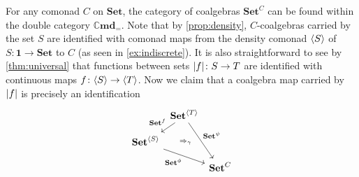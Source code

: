 \documentclass[11pt, oneside, article]{memoir}
\theoremstyle{plain}
\theoremstyle{definition}
\theoremstyle{remark}
\newenvironment{remark}
{\renewcommand\qedsymbol{$\lrcorner$}%
  \pushQED{\qed}\myremark}
{\popQED\endmyremark}
\DeclarePairedDelimiter{\gen}{\langle}{\rangle}
\DeclarePairedDelimiter{\abs}{\lvert}{\rvert}
\newcommand{\namedcat}[1]{\mathbf{#1}}
\newcommand{\Set}{\namedcat{Set}}
\newcommand{\Cmd}{\mathbb{C}\namedcat{md}}
\newcommand{\CmdId}{\Cmd_=}
\newcommand{\CmdIdSet}{\CmdId}
\newcommand{\CoalgOn}[2]{{#2}^{#1}}
\newcommand{\CoalgSet}[1]{\CoalgOn{#1}{\Set}}
\newcommand{\pts}[1]{{\abs{#1}}}
\newcommand{\one}[1]{\pts{#1}}
\newcommand{\lift}[1]{\widecheck{#1}}
\newcommand{\point}{\mathbf{1}}
\newcommand{\com}[2]{{#1}^{#2}}
\newcommand{\con}[2]{{#1}^{#2}}
\newcommand{\cmnd}[1]{{#1}}
\newcommand{\cC}{\cmnd{C}}
\newcommand{\CSet}{\CoalgSet{\cC}}
\begin{document}
\begin{remark}\label{rem:doublecoalgebra}
  For any comonad $\cC$ on $\Set$, the category of coalgebras $\CSet$
  can be found within the double category $\CmdIdSet$. Note that by
  \cref{prop:density}, $\cC$-coalgebras carried by the set $S$ are
  identified with comonad maps from the density comonad $\gen{S}$ of
  $S \colon \point \to \Set$ to $\cC$ (as seen in
  \cref{ex:indiscrete}). It is also straightforward to see by
  \cref{thm:universal} that functions between sets
  $\one{f} \colon S \to T$ are identified with continuous maps
  $f \colon \gen{S} \to \gen{T}$.  Now we claim that a coalgebra map
  carried by $\one{f}$ is precisely an identification
  \[\begin{tikzcd}[column sep=2.5pt,row sep=10pt]
      & {\CoalgSet{\gen{T}}} & \\
      {\CoalgSet{\gen{S}}} \\
      && \CSet
      \arrow[""{name=0, anchor=center, inner sep=0}, "{\con{\Set}{f}}"', from=1-2, to=2-1]
      \arrow["{\com{\Set}{\psi}}", from=1-2, to=3-3]
      \arrow["{\com{\Set}{\phi}}"', from=2-1, to=3-3]
      \arrow["{\Rightarrow_\gamma}"{anchor=center,pos=.45}, shift right=1pt, draw=none, from=0, to=3-3]
    \end{tikzcd}\]
  


\end{remark}
\end{document}
